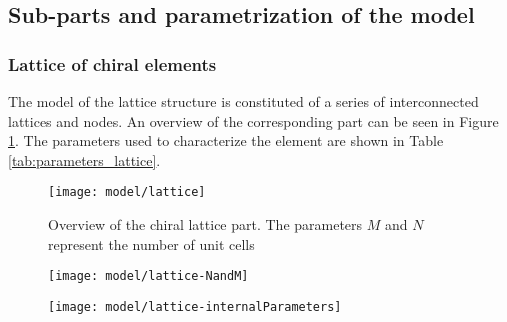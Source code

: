 \subsection{Sub-parts and parametrization of the model} \label{subsec:parametrization_Model}

\subsubsection{Lattice of chiral elements} \label{subsubsec:lattice_Parametrization}

The model of the lattice structure is constituted of a series of interconnected lattices and nodes. An overview of the corresponding part can be seen in Figure \ref{fig:lattice}. The parameters used to characterize the element are shown in Table \ref{tab:parameters_lattice}. 

\begin{figure}[!htpb]
  \centering
  \texttt{[image: model/lattice]}
  \caption[Overview of the chiral lattice part]{Overview of the chiral lattice part. The parameters $M$ and $N$ represent the number of unit cells }\label{fig:lattice}
\end{figure}

\begin{figure}[!htpb]
  \centering
  \texttt{[image: model/lattice-NandM]}
  \caption[]{}\label{fig:lattice-NandM}
\end{figure}

\begin{figure}[!htpb]
  \centering
  \texttt{[image: model/lattice-internalParameters]}
  \caption[]{}\label{fig:lattice-internalParameters}
\end{figure}

